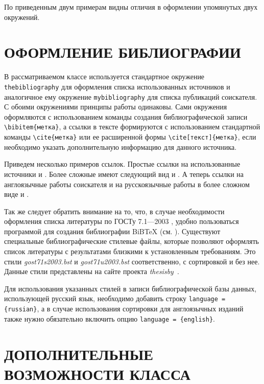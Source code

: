 По приведенным двум примерам видны отличия в оформлении упомянутых двух
окружений.


\chapter{ОФОРМЛЕНИЕ БИБЛИОГРАФИИ}

В рассматриваемом классе используется стандартное окружение
\verb|thebibliography| для оформления списка использованных источников и
аналогичное ему окружение \verb|mybibliography| для списка публикаций
соискателя. С обоими окружениями принципы работы одинаковы. Сами окружения
оформляются с использованием команды создания библиографической записи
\verb|\bibitem{метка}|, а ссылки в тексте формируются с использованием
стандартной команды \verb|\cite{метка}| или ее расширенной формы
\verb|\cite[текст]{метка}|, если необходимо указать дополнительную информацию
для данного источника.

Приведем несколько примеров ссылок. Простые ссылки на использованные источники
\cite{Kotelnikov,article} и 
\cite{proc}. Более сложные имеют следующий вид \cite[с. 25]{Kotelnikov} и
\cite[формула 2]{article}. А теперь ссылки на англоязычные работы соискателя
\cite{myarticle,myproc}  и на русскоязычные работы в более сложном виде
\cite[формула~4]{myrussianarticle} и \cite[глава~2]{mybook}.

Так же следует обратить внимание на то, что, в случае необходимости оформления
списка литературы по ГОСТу 7.1—2003 \cite{gost7-1}, удобно пользоваться программой для создания библиографии BiBTeX (см. \cite[глава 13]{Kotelnikov}). Существуют специальные
библиографические стилевые файлы, которые позволяют оформлять список литературы
с результатами близкими к установленным требованиям. Это стили {\itshape
gost71s2003.bst} и {\itshape gost71u2003.bst} соответственно, с сортировкой и без
нее. Данные стили представлены на сайте проекта {\itshape thesisby}~\cite{gost71_2003}.

Для использования указанных стилей в записи  библиографической базы
данных, использующей русский язык, необходимо добавить строку
\verb|language = {russian}|, а в случае использования сортировки для англоязычных изданий также нужно обязательно включить опцию \verb|language = {english}|.


\chapter{ДОПОЛНИТЕЛЬНЫЕ ВОЗМОЖНОСТИ КЛАССА}

